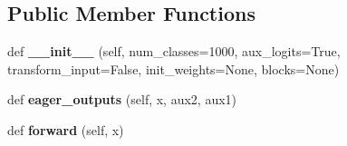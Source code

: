 \subsection*{Public Member Functions}
\begin{DoxyCompactItemize}
\item 
\mbox{\label{classtorchvision_1_1models_1_1googlenet_1_1GoogLeNet_a5752a716344dcd88d4305319c3a37930}} 
def {\bfseries \+\_\+\+\_\+init\+\_\+\+\_\+} (self, num\+\_\+classes=1000, aux\+\_\+logits=True, transform\+\_\+input=False, init\+\_\+weights=None, blocks=None)
\item 
\mbox{\label{classtorchvision_1_1models_1_1googlenet_1_1GoogLeNet_a715e84e7aca2c6fe9f72ef3dd6d784aa}} 
def {\bfseries eager\+\_\+outputs} (self, x, aux2, aux1)
\item 
\mbox{\label{classtorchvision_1_1models_1_1googlenet_1_1GoogLeNet_a354f36e1135209c1e91b1ff5ce2012ef}} 
def {\bfseries forward} (self, x)
\end{DoxyCompactItemize}
